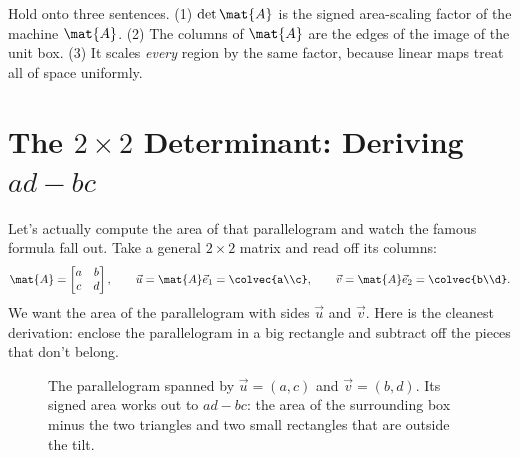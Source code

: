 \begin{focusbox}
Hold onto three sentences. (1) $\det\mat{A}$ is the signed area-scaling factor of
the machine $\mat{A}$. (2) The columns of $\mat{A}$ are the edges of the image of
the unit box. (3) It scales \emph{every} region by the same factor, because
linear maps treat all of space uniformly.
\end{focusbox}

\section{The $2\times 2$ Determinant: Deriving \texorpdfstring{$ad-bc$}{ad-bc}}
\label{ch21:2x2}

Let's actually compute the area of that parallelogram and watch the famous formula
fall out. Take a general $2\times 2$ matrix and read off its columns:
\[
  \mat{A} = \begin{bmatrix} a & b \\ c & d \end{bmatrix},
  \qquad
  \vec{u} = \mat{A}\vec{e}_1 = \colvec{a\\c},
  \qquad
  \vec{v} = \mat{A}\vec{e}_2 = \colvec{b\\d}.
\]
We want the area of the parallelogram with sides $\vec{u}$ and $\vec{v}$. Here is
the cleanest derivation: enclose the parallelogram in a big rectangle and subtract
off the pieces that don't belong.

\begin{figure}[H]
\centering
{}
\caption{The parallelogram spanned by $\vec{u}=(a,c)$ and $\vec{v}=(b,d)$. Its
signed area works out to $ad-bc$: the area of the surrounding box minus the two
triangles and two small rectangles that are outside the tilt.}
\label{ch21:fig-shear-area}
\end{figure}


